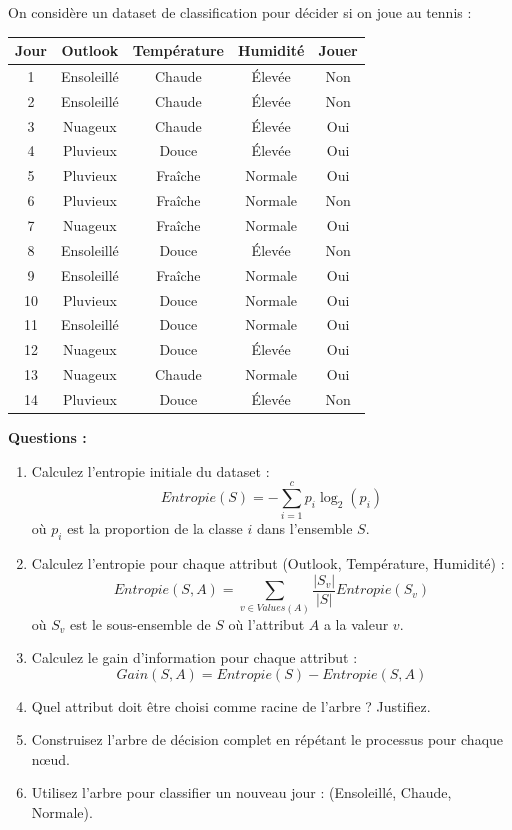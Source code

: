 \documentclass[11pt,a4paper]{article}
\begin{document}
\begin{databox}
On considère un dataset de classification pour décider si on joue au tennis :

\begin{center}
\begin{tabular}{|c|c|c|c|c|}
\hline
\textbf{Jour} & \textbf{Outlook} & \textbf{Température} & \textbf{Humidité} & \textbf{Jouer} \\
\hline
1 & Ensoleillé & Chaude & Élevée & Non \\
2 & Ensoleillé & Chaude & Élevée & Non \\
3 & Nuageux & Chaude & Élevée & Oui \\
4 & Pluvieux & Douce & Élevée & Oui \\
5 & Pluvieux & Fraîche & Normale & Oui \\
6 & Pluvieux & Fraîche & Normale & Non \\
7 & Nuageux & Fraîche & Normale & Oui \\
8 & Ensoleillé & Douce & Élevée & Non \\
9 & Ensoleillé & Fraîche & Normale & Oui \\
10 & Pluvieux & Douce & Normale & Oui \\
11 & Ensoleillé & Douce & Normale & Oui \\
12 & Nuageux & Douce & Élevée & Oui \\
13 & Nuageux & Chaude & Normale & Oui \\
14 & Pluvieux & Douce & Élevée & Non \\
\hline
\end{tabular}
\end{center}
\end{databox}

\begin{questionbox}
\textbf{Questions :}
\begin{enumerate}
    \item Calculez l'entropie initiale du dataset :
    $$Entropie(S) = -\sum_{i=1}^{c}p_i \log_2(p_i)$$
    où $p_i$ est la proportion de la classe $i$ dans l'ensemble $S$.
    
    \item Calculez l'entropie pour chaque attribut (Outlook, Température, Humidité) :
    $$Entropie(S, A) = \sum_{v \in Values(A)}\frac{|S_v|}{|S|}Entropie(S_v)$$
    où $S_v$ est le sous-ensemble de $S$ où l'attribut $A$ a la valeur $v$.
    
    \item Calculez le gain d'information pour chaque attribut :
    $$Gain(S, A) = Entropie(S) - Entropie(S, A)$$
    
    \item Quel attribut doit être choisi comme racine de l'arbre ? Justifiez.
    
    \item Construisez l'arbre de décision complet en répétant le processus pour chaque nœud.
    
    \item Utilisez l'arbre pour classifier un nouveau jour : (Ensoleillé, Chaude, Normale).
\end{enumerate}
\end{questionbox}
\end{document}
